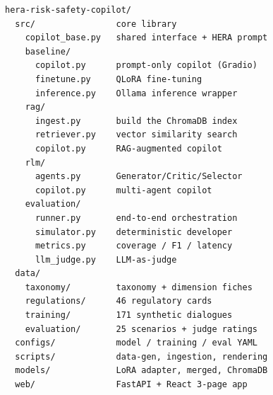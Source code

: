 \documentclass[11pt]{article}
\begin{document}
{\scriptsize
\begin{verbatim}
hera-risk-safety-copilot/
  src/                core library
    copilot_base.py   shared interface + HERA prompt
    baseline/
      copilot.py      prompt-only copilot (Gradio)
      finetune.py     QLoRA fine-tuning
      inference.py    Ollama inference wrapper
    rag/
      ingest.py       build the ChromaDB index
      retriever.py    vector similarity search
      copilot.py      RAG-augmented copilot
    rlm/
      agents.py       Generator/Critic/Selector
      copilot.py      multi-agent copilot
    evaluation/
      runner.py       end-to-end orchestration
      simulator.py    deterministic developer
      metrics.py      coverage / F1 / latency
      llm_judge.py    LLM-as-judge
  data/
    taxonomy/         taxonomy + dimension fiches
    regulations/      46 regulatory cards
    training/         171 synthetic dialogues
    evaluation/       25 scenarios + judge ratings
  configs/            model / training / eval YAML
  scripts/            data-gen, ingestion, rendering
  models/             LoRA adapter, merged, ChromaDB
  web/                FastAPI + React 3-page app
\end{verbatim}
}
\end{document}
